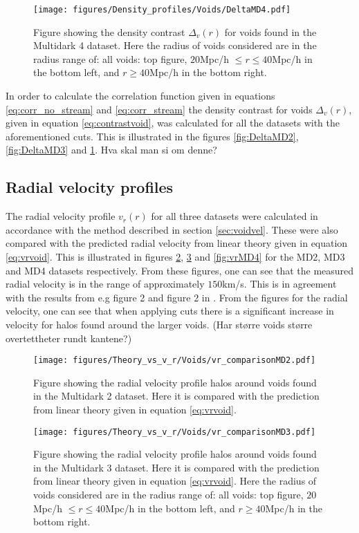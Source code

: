 \begin{figure}[htbp]\label{fig:DeltaMD4}
    \texttt{[image: figures/Density\_profiles/Voids/DeltaMD4.pdf]}
    \caption{Figure showing the density contrast $\Delta_v(r)$ for voids found in the Multidark 4 dataset. Here the radius of voids considered are in the radius range of: all voids: top figure, $20$Mpc/h $\leq r\leq 40$Mpc/h in the bottom left, and $r\geq 40$Mpc/h in the bottom right.}
\end{figure}
In order to calculate the correlation function given in equations \ref{eq:corr_no_stream} and \ref{eq:corr_stream} the density contrast for voids $\Delta_v(r)$, given in equation \ref{eq:contrastvoid}, was calculated for all the datasets with the aforementioned cuts. This is illustrated in the figures \ref{fig:DeltaMD2}, \ref{fig:DeltaMD3} and \ref{fig:DeltaMD4}. Hva skal man si om denne?
\subsection{Radial velocity profiles}
The radial velocity profile $v_r(r)$ for all three datasets were calculated in accordance with the method described in section \ref{sec:voidvel}. These were also compared with the predicted radial velocity from linear theory given in equation \ref{eq:vrvoid}. This is illustrated in figures \ref{fig:vrMD2}, \ref{fig:vrMD3} and \ref{fig:vrMD4} for the MD2, MD3 and MD4 datasets respectively. From these figures, one can see that the measured radial velocity is in the range of approximately $150$km/s. This is in agreement with the results from \cite{Nadathur_2018} e.g figure 2 and figure 2 in \cite{Achitouv_streaming}. From the figures for the radial velocity, one can see that when applying cuts there is a significant increase in velocity for halos found around the larger voids. (Har større voids større overtettheter rundt kantene?)\\\indent
\begin{figure}[htbp]\label{fig:vrMD2}
    \texttt{[image: figures/Theory\_vs\_v\_r/Voids/vr\_comparisonMD2.pdf]}
    \caption{Figure showing the radial velocity profile halos around voids found in the Multidark 2 dataset. Here it is compared with the prediction from linear theory given in equation \ref{eq:vrvoid}.}
\end{figure}

\begin{figure}[htbp]\label{fig:vrMD3}
    \texttt{[image: figures/Theory\_vs\_v\_r/Voids/vr\_comparisonMD3.pdf]}
    \caption{Figure showing the radial velocity profile halos around voids found in the Multidark 3 dataset. Here it is compared with the prediction from linear theory given in equation \ref{eq:vrvoid}. Here the radius of voids considered are in the radius range of: all voids: top figure, $20$Mpc/h $\leq r\leq 40$Mpc/h in the bottom left, and $r\geq 40$Mpc/h in the bottom right.}
\end{figure}


